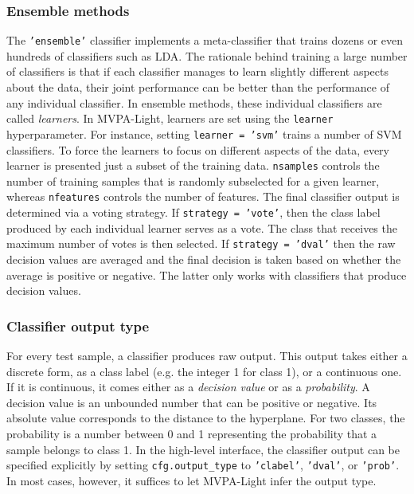 \documentclass[utf8]{frontiersSCNS} %
\newcommand{\ttt}[1]{\texttt{#1}}
\begin{document}
\subsubsection{Ensemble methods}

The \ttt{'ensemble'} classifier implements a meta-classifier that trains dozens
or even hundreds of classifiers such as LDA. The rationale behind training a large number of classifiers is that if each classifier manages to learn slightly different aspects about the data, their joint performance can be better than the performance of any individual classifier.
In ensemble methods, these individual classifiers are called \textit{learners}. In MVPA-Light, learners are set using the \ttt{learner} hyperparameter. For instance, setting \ttt{learner = 'svm'} trains a number of SVM classifiers. To force the learners to focus on different aspects of the data, every learner is presented just a subset of the training data. \ttt{nsamples} controls the number of training samples that is randomly subselected for a given learner, whereas \ttt{nfeatures} controls the number of features.
The final classifier output is determined via a voting strategy. If \ttt{strategy = 'vote'}, then the class label produced by each individual learner serves as a vote. The class that receives the maximum number of votes is then selected. If \ttt{strategy = 'dval'}  then the raw decision values are averaged and the final decision is taken based on whether the average is positive or negative. The latter only works with classifiers that produce decision values. 


\subsubsection{Classifier output type}\label{sec:output}

For every test sample, a classifier produces raw output. This output takes either a discrete form, as a class label (e.g. the integer 1 for class 1), or a continuous one. If it is continuous, it comes either as a \textit{decision value} or as a \textit{probability}. A decision value is an unbounded number that can be positive or negative. Its absolute value corresponds to the distance to the hyperplane. For two classes, the probability is a number between 0 and 1 representing the probability that a sample belongs to class 1.
In the high-level interface, the classifier output can be specified explicitly by setting \ttt{cfg.output\_type} to \ttt{'clabel'}, \ttt{'dval'}, or \ttt{'prob'}. In most cases, however, it suffices to let MVPA-Light infer the output type.
\end{document}
